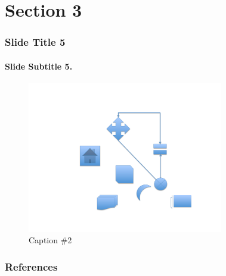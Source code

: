 \documentclass[xcolor={usenames,dvipsnames},hyperref={hyperindex,bookmarks}]{beamer}
\begin{document}
\section{Section 3}

\begin{frame}
	\frametitle{Slide Title 5}
	\framesubtitle{Slide Subtitle 5.}
	
	\begin{figure}
		\centering
		\includegraphics[height=2.6in]{./pics/my_figure}
		\caption{Caption \#2}
	\end{figure}
\end{frame}




{\linespread{1}
\begin{frame}
	\frametitle{References}
	
	
\end{frame}
}
\end{document}
